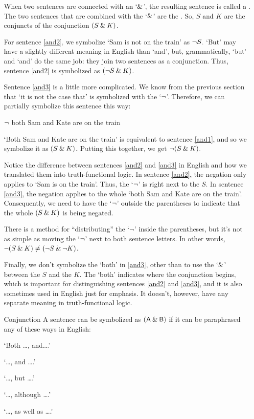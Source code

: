 When two sentences are connected with an `$\mathbin{\&}$', the resulting sentence is called a . The two sentences that are combined with the `$\mathbin{\&}$' are the . So, $S$ and $K$ are the conjuncts of the conjunction $(S \mathbin{\&} K)$.

For sentence \ref{and2}, we symbolize `Sam is not on the train' as ${\neg} S$. `But' may have a slightly different meaning in English than `and', but, grammatically, `but' and `and' do the same job: they join two sentences as a conjunction. Thus, sentence \ref{and2} is symbolized as $({\neg} S \mathbin{\&} K)$.

Sentence \ref{and3} is a little more complicated. We know from the previous section that `it is not the case that' is symbolized with the `${\neg}$'. Therefore, we can partially symbolize this sentence this way:
	\begin{earg}
		\item[] ${\neg}$ both Sam and Kate are on the train
	\end{earg}
`Both Sam and Kate are on the train' is equivalent to sentence \ref{and1}, and so we symbolize it as $(S \mathbin{\&} K)$. Putting this together, we get ${\neg}(S \mathbin{\&} K)$. 

Notice the difference between sentences \ref{and2} and \ref{and3} in English and how we translated them into truth-functional logic. In sentence \ref{and2}, the negation only applies to `Sam is on the train'. Thus, the `${\neg}$' is right next to the $S$. In sentence \ref{and3}, the negation applies to the whole `both Sam and Kate are on the train'. Consequently, we need to have the `${\neg}$' outside the parentheses to indicate that the whole $(S \mathbin{\&} K)$ is being negated.

\begin{notebox}
There is a method for ``distributing'' the `${\neg}$' inside the parentheses, but it's not as simple as moving the `${\neg}$' next to both sentence letters. In other words,  ${\neg}(S \mathbin{\&} K) \neq ({\neg} S \mathbin{\&} {\neg} K)$.  
\end{notebox}


Finally, we don't symbolize the `both' in \ref{and3}, other than to use the `$\mathbin{\&}$' between the $S$ and the $K$. The `both' indicates where the conjunction begins, which is important for distinguishing sentences \ref{and2} and \ref{and3}, and it is also sometimes used in English just for emphasis. It doesn't, however, have any separate meaning in truth-functional logic.

\begin{factboxy}{Conjunction}
A sentence can be symbolized as $(\mathsf{A}\mathbin{\&}\mathsf{B})$ if it can be paraphrased any of these ways in English:
\vspace{-2mm}
\begin{earg}
\item[] `Both \ldots, and\ldots.'
\item[] `\ldots, and \ldots.'
\item[] `\ldots, but \ldots.' 
\item[] `\ldots, although \ldots.'
\item[] `\ldots, as well as \ldots.'
\end{earg}
\end{factboxy}
	
